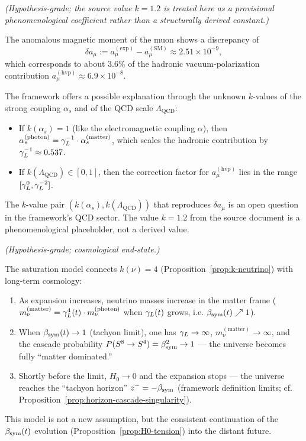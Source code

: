 \begin{proposition}
\label{prop:muon-g2}
\emph{(Hypothesis-grade; the source value $k=1.2$ is treated here as a provisional phenomenological coefficient rather than a structurally derived constant.)}

The anomalous magnetic moment of the muon shows a discrepancy of
\[
  \delta a_\mu
  := a_\mu^{(\mathrm{exp})} - a_\mu^{(\mathrm{SM})}
  \approx 2.51\times 10^{-9},
\]
which corresponds to about $3.6\%$ of the hadronic vacuum-polarization
contribution $a_\mu^{(\mathrm{hvp})} \approx 6.9\times 10^{-8}$.

The framework offers a possible explanation through the unknown
$k$-values of the strong coupling $\alpha_s$ and of the QCD scale
$\Lambda_{\mathrm{QCD}}$:
\begin{itemize}
  \item If $k(\alpha_s) = 1$ (like the electromagnetic coupling $\alpha$),
    then $\alpha_s^{(\mathrm{photon})} = \gamma_L^{-1}\cdot\alpha_s^{(\mathrm{matter})}$,
    which scales the hadronic contribution by $\gamma_L^{-1}\approx 0.537$.
  \item If $k(\Lambda_{\mathrm{QCD}}) \in [0,1]$, then the correction factor
    for $a_\mu^{(\mathrm{hvp})}$ lies in the range $[\gamma_L^0,\gamma_L^{-2}]$.
\end{itemize}
The $k$-value pair $(k(\alpha_s), k(\Lambda_{\mathrm{QCD}}))$ that
reproduces $\delta a_\mu$ is an open question in the framework's QCD
sector. The value $k=1.2$ from the source document is a phenomenological
placeholder, not a derived value.
\end{proposition}

\begin{proposition}
\label{prop:saturation}
\emph{(Hypothesis-grade; cosmological end-state.)}

The saturation model connects $k(\nu)=4$
(Proposition~\ref{prop:k-neutrino}) with long-term cosmology:
\begin{enumerate}[label=(\arabic*)]
  \item As expansion increases, neutrino masses increase in the matter frame
    ($m_\nu^{(\mathrm{matter})} = \gamma_L^4(t)\cdot m_\nu^{(\mathrm{photon})}$
    when $\gamma_L(t)$ grows, i.e. $\beta_{\mathrm{sym}}(t)\nearrow 1$).
  \item When $\beta_{\mathrm{sym}}(t)\to 1$ (tachyon limit), one has
    $\gamma_L\to\infty$, $m_\nu^{(\mathrm{matter})}\to\infty$, and the cascade
    probability $P(S^8\to S^4) = \beta_{\mathrm{sym}}^2\to 1$ --- the universe becomes
    fully ``matter dominated.''
  \item Shortly before the limit, $H_0\to 0$ and the expansion stops ---
    the universe reaches the ``tachyon horizon'' $z^- = -\beta_{\mathrm{sym}}$
    (framework definition limits; cf.
    Proposition~\ref{prop:horizon-cascade-singularity}).
\end{enumerate}
This model is not a new assumption, but the consistent continuation of
the $\beta_{\mathrm{sym}}(t)$ evolution (Proposition~\ref{prop:H0-tension}) into the
distant future.
\end{proposition}

